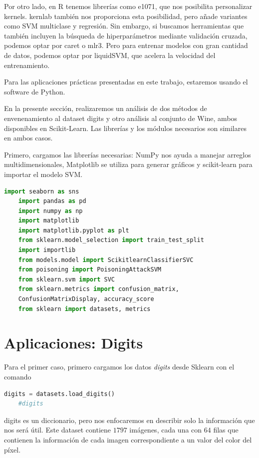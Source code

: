 \documentclass[letterpaper,12pt,oneside]{book}
\begin{document}
{{{{Por otro lado, en R tenemos librerías como e1071, que nos posibilita personalizar kernels. kernlab también nos proporciona esta posibilidad, pero añade variantes como SVM multiclase y regresión. Sin embargo, si buscamos herramientas que también incluyen la búsqueda de hiperparámetros mediante validación cruzada, podemos optar por caret o mlr3. Pero para entrenar modelos con gran cantidad de datos, podemos optar por liquidSVM, que acelera la velocidad del entrenamiento.

Para las aplicaciones prácticas presentadas en este trabajo, estaremos usando el software de Python.

En la presente sección, realizaremos un análisis de dos métodos de envenenamiento al dataset digits y otro análisis al conjunto de Wine, ambos disponibles en Scikit-Learn. Las librerías y los módulos necesarios son similares en ambos casos.

Primero, cargamos las librerías necesarias: NumPy nos ayuda a manejar arreglos multidimensionales, Matplotlib se utiliza para generar gráficos y scikit-learn para importar el modelo SVM.


\begin{lstlisting}[language=Python]
    import seaborn as sns
    import pandas as pd
    import numpy as np
    import matplotlib 
    import matplotlib.pyplot as plt
    from sklearn.model_selection import train_test_split
    import importlib
    from models.model import ScikitlearnClassifierSVC
    from poisoning import PoisoningAttackSVM
    from sklearn.svm import SVC
    from sklearn.metrics import confusion_matrix,
    ConfusionMatrixDisplay, accuracy_score
    from sklearn import datasets, metrics
\end{lstlisting}



\section{Aplicaciones: Digits}

Para el primer caso, primero cargamos los datos \textit{digits} desde Sklearn con el comando
\begin{lstlisting}[language=Python]
    digits = datasets.load_digits()
    #digits
\end{lstlisting}



digits es un diccionario, pero nos enfocaremos en describir solo la información que nos será útil. Este dataset contiene $1797$ imágenes, cada una con $64$ filas que contienen la información de cada imagen correspondiente a un valor del color del píxel.

}}}}
\end{document}
